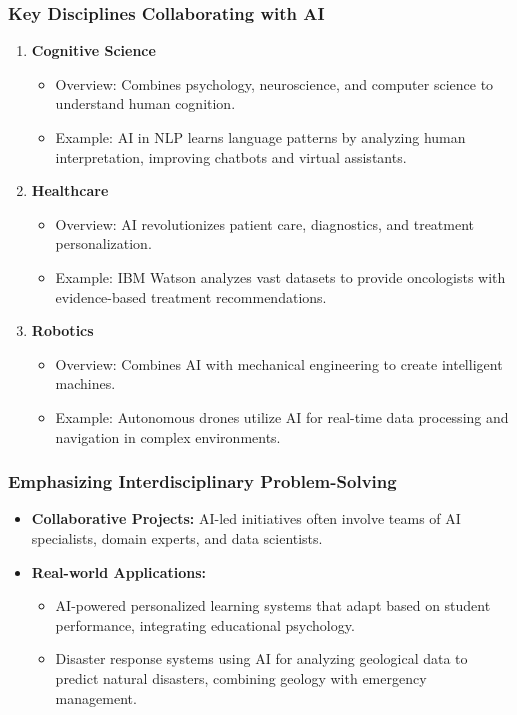 \documentclass[aspectratio=169]{beamer}
\begin{document}
\begin{frame}[fragile]
    \frametitle{Key Disciplines Collaborating with AI}
    \begin{enumerate}
        \item \textbf{Cognitive Science}
            \begin{itemize}
                \item Overview: Combines psychology, neuroscience, and computer science to understand human cognition.
                \item Example: AI in NLP learns language patterns by analyzing human interpretation, improving chatbots and virtual assistants.
            \end{itemize}
        \item \textbf{Healthcare}
            \begin{itemize}
                \item Overview: AI revolutionizes patient care, diagnostics, and treatment personalization.
                \item Example: IBM Watson analyzes vast datasets to provide oncologists with evidence-based treatment recommendations.
            \end{itemize}
        \item \textbf{Robotics}
            \begin{itemize}
                \item Overview: Combines AI with mechanical engineering to create intelligent machines.
                \item Example: Autonomous drones utilize AI for real-time data processing and navigation in complex environments.
            \end{itemize}
    \end{enumerate}
\end{frame}

\begin{frame}[fragile]
    \frametitle{Emphasizing Interdisciplinary Problem-Solving}
    \begin{itemize}
        \item \textbf{Collaborative Projects:} AI-led initiatives often involve teams of AI specialists, domain experts, and data scientists.
        \item \textbf{Real-world Applications:}
            \begin{itemize}
                \item AI-powered personalized learning systems that adapt based on student performance, integrating educational psychology.
                \item Disaster response systems using AI for analyzing geological data to predict natural disasters, combining geology with emergency management.
            \end{itemize}
    \end{itemize}
\end{frame}
\end{document}
